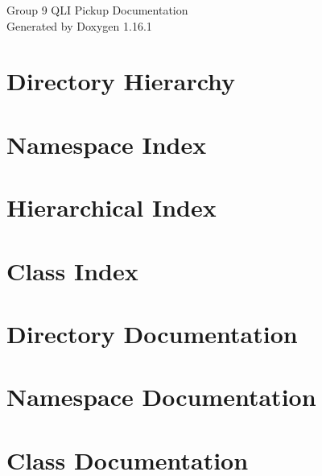 \documentclass[twoside]{book}
\newcommand{\+}{\discretionary{\mbox{\scriptsize$\hookleftarrow$}}{}{}}
\newcommand{\clearemptydoublepage}{%
    \newpage{\pagestyle{empty}\cleardoublepage}%
  }
\begin{document}
  \raggedbottom
    \hypersetup{pageanchor=false,
                bookmarksnumbered=true,
                pdfencoding=unicode
               }
  \begin{titlepage}
  \vspace*{7cm}
  \begin{center}%
  {\Large Group 9 QLI Pickup Documentation}\\
  \vspace*{1cm}
  {\large Generated by Doxygen 1.16.1}\\
  \end{center}
  \end{titlepage}
  \clearemptydoublepage
  \tableofcontents
  \clearemptydoublepage
  \hypersetup{pageanchor=true}

\chapter{Directory Hierarchy}

\chapter{Namespace Index}

\chapter{Hierarchical Index}

\chapter{Class Index}

\chapter{Directory Documentation}

\chapter{Namespace Documentation}


\chapter{Class Documentation}


  \backmatter
  \newpage
  \clearemptydoublepage
  \printindex
\end{document}

